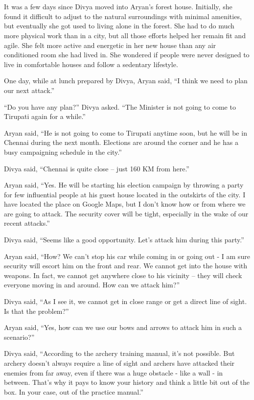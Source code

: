 \chapter{}

It was a few days since Divya moved into Aryan's forest house. Initially, she
found it difficult to adjust to the natural surroundings with minimal amenities,
but eventually she got used to living alone in the forest. She had to do much
more physical work than in a city, but all those efforts helped her remain fit
and agile. She felt more active and energetic in her new house than any air
conditioned room she had lived in. She wondered if people were never designed to
live in comfortable houses and follow a sedentary lifestyle.

One day, while at lunch prepared by Divya, Aryan said, “I think we need to plan
our next attack.”

“Do you have any plan?” Divya asked. “The Minister is not going to come to
Tirupati again for a while.”

Aryan said, “He is not going to come to Tirupati anytime soon, but he will be in
Chennai during the next month. Elections are around the corner and he has a busy
campaigning schedule in the city.”

Divya said, “Chennai is quite close – just 160 KM from here.”

Aryan said, “Yes. He will be starting his election campaign by throwing a party
for few influential people at his guest house located in the outskirts of the
city. I have located the place on Google Maps, but I don't know how or from
where we are going to attack. The security cover will be tight, especially in
the wake of our recent attacks.”

Divya said, “Seems like a good opportunity. Let's attack him during this party.”

Aryan said, “How? We can't stop his car while coming in or going out - I am sure
security will escort him on the front and rear. We cannot get into the house
with weapons. In fact, we cannot get anywhere close to his vicinity – they will
check everyone moving in and around. How can we attack him?”

Divya said, “As I see it, we cannot get in close range or get a direct line of
sight. Is that the problem?”

Aryan said, “Yes, how can we use our bows and arrows to attack him in such a
scenario?”

Divya said, “According to the archery training manual, it's not possible. But
archery doesn't always require a line of sight and archers have attacked their
enemies from far away, even if there was a huge obstacle - like a wall - in
between. That's why it pays to know your history and think a little bit out of
the box. In your case, out of the practice manual.”

